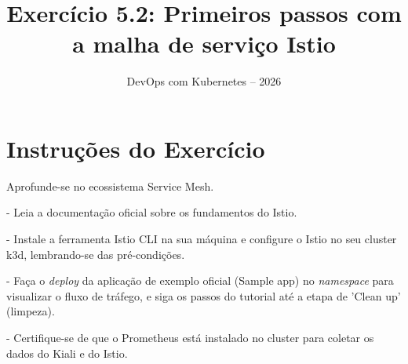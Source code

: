 \documentclass[11pt,a4paper]{article}
\title{\color{secondary}\Huge\textbf{Exercício 5.2: Primeiros passos com a malha de serviço Istio}}
\author{\color{primary}DevOps com Kubernetes -- 2026}
\date{}
\begin{document}
\maketitle

\section*{\color{primary}Instruções do Exercício}
\begin{tcolorbox}[colback=blue!5!white,colframe=blue!75!black,title=Exercício 5.2: Primeiros passos com a malha de serviço Istio]
Aprofunde-se no ecossistema Service Mesh.

- Leia a documentação oficial sobre os fundamentos do Istio.

- Instale a ferramenta Istio CLI na sua máquina e configure o Istio no seu cluster k3d, lembrando-se das pré-condições.

- Faça o \textit{deploy} da aplicação de exemplo oficial (Sample app) no \textit{namespace} para visualizar o fluxo de tráfego, e siga os passos do tutorial até a etapa de 'Clean up' (limpeza).

- Certifique-se de que o Prometheus está instalado no cluster para coletar os dados do Kiali e do Istio.
\end{tcolorbox}
\end{document}
